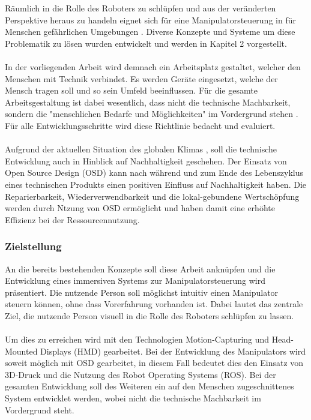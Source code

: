   Räumlich in die Rolle des Roboters zu schlüpfen und aus der veränderten Perspektive heraus zu handeln eignet sich für eine Manipulatorsteuerung in für Menschen gefährlichen Umgebungen \cite[S.9]{mareczek_grundlagen_2020}. Diverse Konzepte und Systeme um diese Problematik zu lösen wurden entwickelt und werden in Kapitel 2 vorgestellt.\\\\
  In der vorliegenden Arbeit wird demnach ein Arbeitsplatz gestaltet, welcher den Menschen mit Technik verbindet. Es werden Geräte eingesetzt, welche der Mensch tragen soll und so sein Umfeld beeinflussen. Für die gesamte Arbeitsgestaltung ist dabei wesentlich, dass nicht die technische Machbarkeit, sondern die "menschlichen Bedarfe und Möglichkeiten" im Vordergrund stehen \cite{strater_positionspapier_2019}. Für alle Entwicklungsschritte wird diese Richtlinie bedacht und evaluiert.\\\\
  Aufgrund der aktuellen Situation des globalen Klimas \cite{ipcc_climate_2021}, soll die technische Entwicklung auch in Hinblick auf Nachhaltigkeit geschehen. Der Einsatz von Open Source Design (OSD) kann nach \cite{setchi_implications_2016} während und zum Ende des Lebenszyklus eines technischen Produkts einen positiven Einfluss auf Nachhaltigkeit haben. Die Reparierbarkeit, Wiederverwendbarkeit und die lokal-gebundene Wertschöpfung werden durch Ntzung von OSD ermöglicht und haben damit eine erhöhte Effizienz bei der Ressourcennutzung.
\subsubsection{Zielstellung} \label{1:sec:ziel}
  An die bereits bestehenden Konzepte soll diese Arbeit anknüpfen und die Entwicklung eines immersiven Systems zur Manipulatorsteuerung wird präsentiert. Die nutzende Person soll möglichst intuitiv einen Manipulator steuern können, ohne dass Vorerfahrung vorhanden ist. Dabei lautet das zentrale Ziel, die nutzende Person visuell in die Rolle des Roboters schlüpfen zu lassen. \\\\
  Um dies zu erreichen wird mit den Technologien Motion-Capturing und Head-Mounted Displays (HMD) gearbeitet. Bei der Entwicklung des Manipulators wird soweit möglich mit OSD gearbeitet, in diesem Fall bedeutet dies den Einsatz von 3D-Druck und die Nutzung des Robot Operating Systems (ROS). Bei der gesamten Entwicklung soll des Weiteren ein auf den Menschen zugeschnittenes System entwicklet werden, wobei nicht die technische Machbarkeit im Vordergrund steht.
